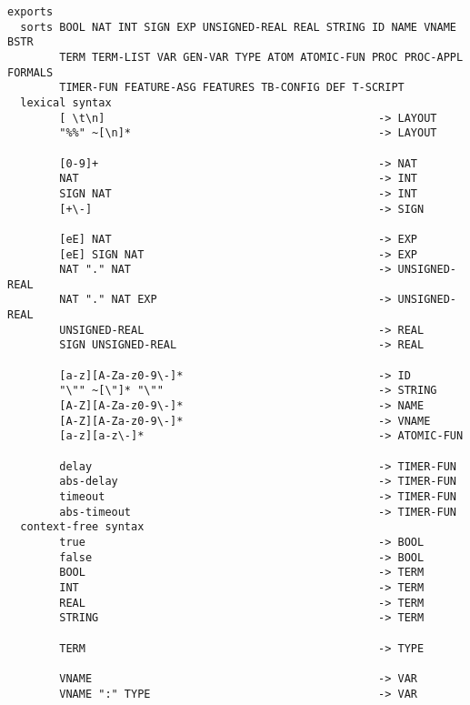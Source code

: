 \small
\begin{verbatim}
exports
  sorts BOOL NAT INT SIGN EXP UNSIGNED-REAL REAL STRING ID NAME VNAME BSTR
        TERM TERM-LIST VAR GEN-VAR TYPE ATOM ATOMIC-FUN PROC PROC-APPL FORMALS
        TIMER-FUN FEATURE-ASG FEATURES TB-CONFIG DEF T-SCRIPT
  lexical syntax
        [ \t\n]                                          -> LAYOUT
        "%%" ~[\n]*                                      -> LAYOUT

        [0-9]+                                           -> NAT
        NAT                                              -> INT
        SIGN NAT                                         -> INT
        [+\-]                                            -> SIGN

        [eE] NAT                                         -> EXP
        [eE] SIGN NAT                                    -> EXP
        NAT "." NAT                                      -> UNSIGNED-REAL
        NAT "." NAT EXP                                  -> UNSIGNED-REAL
        UNSIGNED-REAL                                    -> REAL
        SIGN UNSIGNED-REAL                               -> REAL

        [a-z][A-Za-z0-9\-]*                              -> ID
        "\"" ~[\"]* "\""                                 -> STRING
        [A-Z][A-Za-z0-9\-]*                              -> NAME
        [A-Z][A-Za-z0-9\-]*                              -> VNAME
        [a-z][a-z\-]*                                    -> ATOMIC-FUN

        delay                                            -> TIMER-FUN
        abs-delay                                        -> TIMER-FUN
        timeout                                          -> TIMER-FUN
        abs-timeout                                      -> TIMER-FUN
  context-free syntax
        true                                             -> BOOL
        false                                            -> BOOL
        BOOL                                             -> TERM
        INT                                              -> TERM
        REAL                                             -> TERM
        STRING                                           -> TERM

        TERM                                             -> TYPE

        VNAME                                            -> VAR
        VNAME ":" TYPE                                   -> VAR


\end{verbatim}

